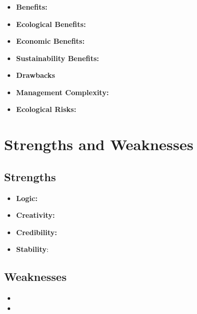 \documentclass[12pt]{article}
\begin{document}
\subsubsection{}

\subsubsection{}

\subsubsection{}


\begin{itemize}
    \item \textbf{Benefits:}
    \item[1] \textbf{Ecological Benefits:} 
    \item[2] \textbf{Economic Benefits:} 
    \item[3] \textbf{Sustainability Benefits:} 
    \item \textbf{Drawbacks}
    \item[1] \textbf{Management Complexity:} 
    \item[2] \textbf{Ecological Risks:} 
\end{itemize}

\subsection{}



\section{Strengths and Weaknesses}
\subsection{Strengths}
\begin{itemize}
    \item \textbf{Logic:} 
    \item \textbf{Creativity:} 
    \item \textbf{Credibility:} 
    \item \textbf{Stability}: 
\end{itemize}


\subsection{Weaknesses}
\begin{itemize}
    \item 
    \item 
\end{itemize}
\end{document}
